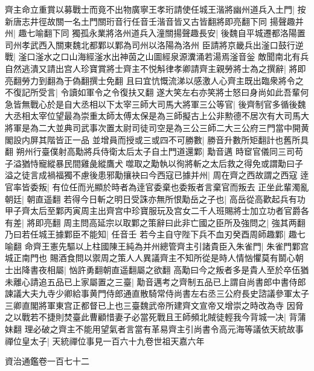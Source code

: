齊主命立重賞以募戰士而竟不出物廣寧王孝珩請使任城王湝將幽州道兵入土門|{
	按新唐志井徑故關一名土門關珩音行任音壬湝音皆又古皆翻將即亮翻下同}
揚聲趣并州|{
	趣七喻翻下同}
獨孤永業將洛州道兵入潼關揚聲趣長安|{
	後魏自平城遷都洛陽置司州孝武西入關東魏北都鄴以鄴為司州以洛陽為洛州}
臣請將京畿兵出滏口鼓行逆戰|{
	滏口滏水之口山海經滏水出神茵之山圖經泉源瀵涌若湯焉滏音釡}
敵聞南北有兵自然逃潰又請出宫人珍寶賞將士齊主不悦斛律孝卿請齊主親勞將士為之撰辭|{
	將即亮翻勞力到翻為于偽翻撰士免翻}
且曰宜忼慨流涕以感激人心齊主既出臨衆將令之不復記所受言|{
	令讀如軍令之令復扶又翻}
遂大笑左右亦笑將士怒曰身尚如此吾輩何急皆無戰心於是自大丞相以下太宰三師大司馬大將軍三公等官|{
	後齊制官多循後魏大丞相太宰位望最為崇重太師太傅太保是為三師擬古上公非勲德不居次有大司馬大將軍是為二大並典司武事次置太尉司徒司空是為三公三師二大三公府三門當中開黄閣設内屏其階皆正一品}
並增員而授或三或四不可勝數|{
	勝音升數所矩翻計也舊所具翻}
朔州行臺僕射高勱將兵侍衛太后太子自土門道還鄴|{
	勱音邁}
時䆠官儀同三司苟子溢猶恃寵縱暴民間雞彘縱鷹犬噬取之勱執以徇將斬之太后救之得免或謂勱曰子溢之徒言成禍福獨不慮後患邪勱攘袂曰今西寇已據并州|{
	周在齊之西故謂之西寇}
逹官率皆委叛|{
	有位任而光顯於時者為逹官委棄也委叛者言棄官而叛去}
正坐此輩濁亂朝廷|{
	朝直遥翻}
若得今日斬之明日受誅亦無所恨勱岳之子也|{
	高岳從高歡起兵有功}
甲子齊太后至鄴丙寅周主出齊宫中珍寶服玩及宫女二千人班賜將士加立功者官爵各有差|{
	將即亮翻}
周主問高延宗以取鄴之策辭曰此非亡國之臣所及強問之|{
	強其两翻}
乃曰若任城王據鄴臣不能知|{
	任音壬}
若今主自守陛下兵不血刃癸酉周師趣鄴|{
	趣七喻翻}
命齊王憲先驅以上柱國陳王純為并州總管齊主引諸貴臣入朱雀門|{
	朱雀門鄴宫城正南門也}
賜酒食問以禦周之策人人異議齊主不知所從是時人情忷懼莫有鬬心朝士出降書夜相屬|{
	忷許勇翻朝直遥翻屬之欲翻}
高勱曰今之叛者多是貴人至於卒伍猶未離心請追五品已上家屬置之三臺|{
	勱音邁考之齊制五品已上謂自尚書郎中書侍郎諫議大夫九寺少卿給事黄門侍郎通直散騎常侍尚書左右丞三公府長史諮議參軍太子三卿直閣將軍東宫正都督已上也三臺魏武帝所建齊文宣帝又增崇之時改為寺}
因脅之以戰若不捷則焚臺此曹顧惜妻子必當死戰且王師頻北賊徒輕我今背城一决|{
	背蒲妹翻}
理必破之齊主不能用望氣者言當有革易齊主引尚書令高元海等議依天統故事禪位皇太子|{
	天統禪位事見一百六十九卷世祖天嘉六年}


資治通鑑卷一百七十二
